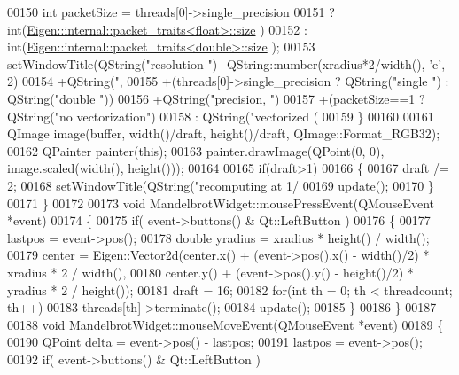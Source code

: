 \begin{DoxyCode}
00150     \textcolor{keywordtype}{int} packetSize = threads[0]->single\_precision
00151                    ? int(\hyperlink{struct_eigen_1_1internal_1_1packet__traits}{Eigen::internal::packet\_traits<float>::size}
      )
00152                    : int(\hyperlink{struct_eigen_1_1internal_1_1packet__traits}{Eigen::internal::packet\_traits<double>::size}
      );
00153     setWindowTitle(QString(\textcolor{stringliteral}{"resolution "})+QString::number(xradius*2/width(), \textcolor{charliteral}{'e'}, 2)
00154                   +QString(\textcolor{stringliteral}{", %
00155                   +(threads[0]->single\_precision ? QString(\textcolor{stringliteral}{"single "}) : QString(\textcolor{stringliteral}{"double "}))
00156                   +QString(\textcolor{stringliteral}{"precision, "})
00157                   +(packetSize==1 ? QString(\textcolor{stringliteral}{"no vectorization"})
00158                                   : QString(\textcolor{stringliteral}{"vectorized (%
00159   \}
00160   
00161   QImage image(buffer, width()/draft, height()/draft, QImage::Format\_RGB32);
00162   QPainter painter(\textcolor{keyword}{this});
00163   painter.drawImage(QPoint(0, 0), image.scaled(width(), height()));
00164 
00165   \textcolor{keywordflow}{if}(draft>1)
00166   \{
00167     draft /= 2;
00168     setWindowTitle(QString(\textcolor{stringliteral}{"recomputing at 1/%
00169     update();
00170   \}
00171 \}
00172 
00173 \textcolor{keywordtype}{void} MandelbrotWidget::mousePressEvent(QMouseEvent *event)
00174 \{
00175   \textcolor{keywordflow}{if}( event->buttons() & Qt::LeftButton )
00176   \{
00177     lastpos = \textcolor{keyword}{event}->pos();
00178     \textcolor{keywordtype}{double} yradius = xradius * height() / width();
00179     center = Eigen::Vector2d(center.x() + (\textcolor{keyword}{event}->pos().x() - width()/2) * xradius * 2 / width(),
00180                              center.y() + (\textcolor{keyword}{event}->pos().y() - height()/2) * yradius * 2 / height());
00181     draft = 16;
00182     \textcolor{keywordflow}{for}(\textcolor{keywordtype}{int} th = 0; th < threadcount; th++)
00183       threads[th]->terminate();
00184     update();
00185   \}
00186 \}
00187 
00188 \textcolor{keywordtype}{void} MandelbrotWidget::mouseMoveEvent(QMouseEvent *event)
00189 \{
00190   QPoint delta = \textcolor{keyword}{event}->pos() - lastpos;
00191   lastpos = \textcolor{keyword}{event}->pos();
00192   \textcolor{keywordflow}{if}( event->buttons() & Qt::LeftButton )
}}}
\end{DoxyCode}
